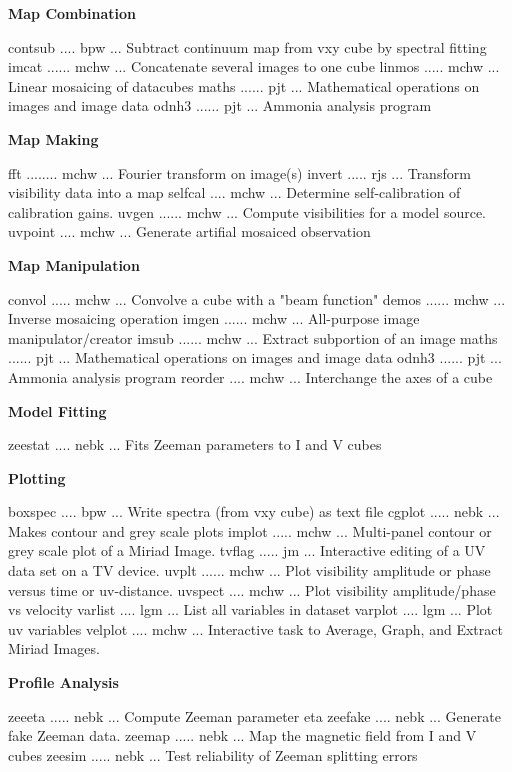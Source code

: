\par\centerline {\bf Map Combination}
{\eightpoint\begintt
contsub .... bpw  ... Subtract continuum map from vxy cube by spectral fitting 
imcat ...... mchw ... Concatenate several images to one cube 
linmos ..... mchw ... Linear mosaicing of datacubes 
maths ...... pjt  ... Mathematical operations on images and image data 
odnh3 ...... pjt  ... Ammonia analysis program 
\endtt}
\par\centerline {\bf Map Making}
{\eightpoint\begintt
fft ........ mchw ... Fourier transform on image(s) 
invert ..... rjs  ... Transform visibility data into a map 
selfcal .... mchw ... Determine self-calibration of calibration gains. 
uvgen ...... mchw ... Compute visibilities for a model source. 
uvpoint .... mchw ... Generate artifial mosaiced observation 
\endtt}
\par\centerline {\bf Map Manipulation}
{\eightpoint\begintt
convol ..... mchw ... Convolve a cube with a "beam function" 
demos ...... mchw ... Inverse mosaicing operation 
imgen ...... mchw ... All-purpose image manipulator/creator 
imsub ...... mchw ... Extract subportion of an image 
maths ...... pjt  ... Mathematical operations on images and image data 
\endtt}
{\eightpoint\begintt
odnh3 ...... pjt  ... Ammonia analysis program 
reorder .... mchw ... Interchange the axes of a cube 
\endtt}
\vfill\eject
\par\centerline {\bf Model Fitting}
{\eightpoint\begintt
zeestat .... nebk ... Fits Zeeman parameters to I and V cubes 
\endtt}
\par\centerline {\bf Plotting}
{\eightpoint\begintt
boxspec .... bpw  ... Write spectra (from vxy cube) as text file 
cgplot ..... nebk ... Makes contour and grey scale plots 
implot ..... mchw ... Multi-panel contour or grey scale plot of a Miriad Image. 
tvflag ..... jm   ... Interactive editing of a UV data set on a TV device. 
uvplt ...... mchw ... Plot visibility amplitude or phase versus time or uv-distance. 
\endtt}
{\eightpoint\begintt
uvspect .... mchw ... Plot visibility amplitude/phase vs velocity 
varlist .... lgm  ... List all variables in dataset 
varplot .... lgm  ... Plot uv variables 
velplot .... mchw ... Interactive task to Average, Graph, and Extract Miriad Images. 
\endtt}
\par\centerline {\bf Profile Analysis}
{\eightpoint\begintt
zeeeta ..... nebk ... Compute Zeeman parameter eta 
zeefake .... nebk ... Generate fake Zeeman data. 
zeemap ..... nebk ... Map the magnetic field from I and V cubes 
zeesim ..... nebk ... Test reliability of Zeeman splitting errors 
\endtt}
